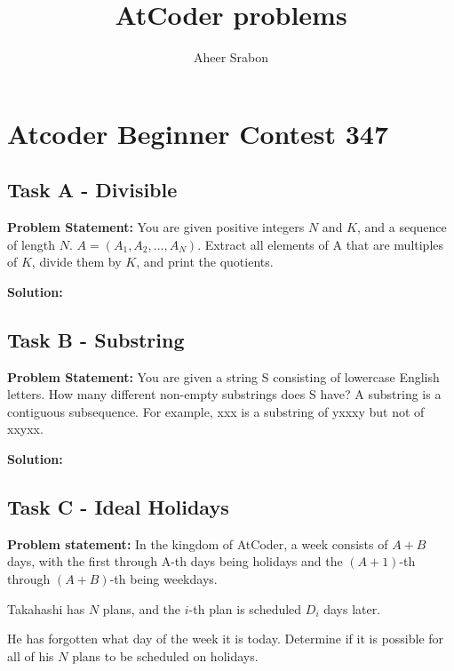

\title{AtCoder problems}
\author{Aheer Srabon}
\date{}


	\maketitle

	\section{Atcoder Beginner Contest 347}
	\subsection{Task A - Divisible}
	\noindent \textbf{Problem Statement: } You are given positive
	integers $ N $ and $ K $, and a sequence of length $ N $.
	$ A = (A_1, A_2,...,A_N) $. Extract all elements of A that are
	multiples of $ K $, divide them by $ K $, and print the
	quotients.

	\vspace{1cm}

	\noindent \textbf{Solution: }
	

	\subsection{Task B - Substring}
	\noindent \textbf{Problem Statement: } You are given a string 
	S consisting of lowercase English letters. How many different 
	non-empty substrings does S have?
	A substring is a contiguous subsequence.
	For example, xxx is a substring of yxxxy but not of xxyxx.

	\vspace{1cm}

	\noindent \textbf{Solution: }
	

	\subsection{Task C - Ideal Holidays}
	\noindent \textbf{Problem statement: } In the kingdom of AtCoder,
	a week consists of $ A + B $ days, with the first through A-th
	days being holidays and the $ (A+1) $-th through $ (A+B) $-th
	being weekdays.

	\noindent Takahashi has $ N $ plans, and the $ i $-th plan is
	scheduled $ D_i $ days later.

	\noindent He has forgotten what day of the week it is today.
	Determine if it is possible for all of his $ N $ plans to be
	scheduled on holidays.

